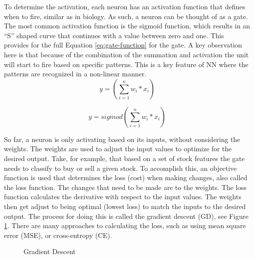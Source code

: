 \documentclass[11pt]{article}
\begin{document}
To determine the activation, each neuron has an activation function that defines when to fire, similar as in biology. As such, a neuron can be thought of as a gate. The most common activation function is the sigmoid function, which results in an ``S'' shaped curve that continues with a value between zero and one. This provides for the full Equation \ref{eq:gate-function} for the gate. A key observation here is that because of the combination of the summation and activation the unit will start to fire based on specific patterns. This is a key feature of NN where the patterns are recognized in a non-linear manner.
\begin{equation}
\label{eq:sum-function}
y=(\sum_{i=1}^n w_i*x_i)
\end{equation}

\begin{equation}
\label{eq:gate-function}
y=sigmod(\sum_{i=1}^n w_i*x_i)
\end{equation}

So far, a neuron is only activating based on its inputs, without considering the weights. The weights are used to adjust the input values to optimize for the desired output. Take, for example, that based on a set of stock features the gate needs to classify to buy or sell a given stock. To accomplish this, an objective function is used that determines the loss (cost) when making changes, also called the loss function. The changes that need to be made are to the weights. The loss function calculates the derivative with respect to the input values. The weights then get adjust to being optimal (lowest loss) to match the inputs to the desired output. The process for doing this is called the gradient descent (GD), see Figure \ref{fig:gradient-descent}. There are many approaches to calculating the loss, such as using mean square error (MSE), or cross-entropy (CE).
\begin{figure}[!ht]
	\centering
	\caption{Gradient Descent}
	\label{fig:gradient-descent}
\end{figure}
\end{document}
